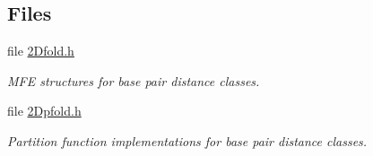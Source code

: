 \subsection*{Files}
\begin{DoxyCompactItemize}
\item 
file \mbox{\hyperlink{2_dfold_8h}{2\+Dfold.\+h}}
\begin{DoxyCompactList}\small\item\em M\+FE structures for base pair distance classes. \end{DoxyCompactList}\item 
file \mbox{\hyperlink{2_dpfold_8h}{2\+Dpfold.\+h}}
\begin{DoxyCompactList}\small\item\em Partition function implementations for base pair distance classes. \end{DoxyCompactList}\end{DoxyCompactItemize}
